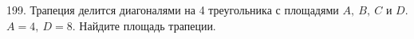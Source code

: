 199. Трапеция делится диагоналями на 4 треугольника с площадями $A,\ B,\ C$ и $D.$ $A=4,\ D=8.$ Найдите площадь трапеции.\\
